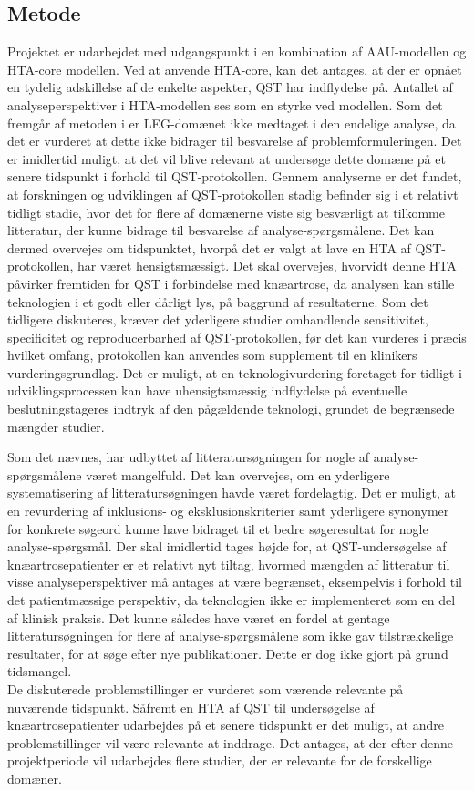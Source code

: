 \subsection{Metode} \label{Metode_diskussion} %
Projektet er udarbejdet med udgangspunkt i en kombination af AAU-modellen og HTA-core modellen. Ved at anvende HTA-core, kan det antages, at der er opnået en tydelig adskillelse af de enkelte aspekter, QST har indflydelse på.
Antallet af analyseperspektiver i HTA-modellen ses som en styrke ved modellen. Som det fremgår af metoden i  er LEG-domænet ikke medtaget i den endelige analyse, da det er vurderet at dette ikke bidrager til besvarelse af problemformuleringen. Det er imidlertid muligt, at det vil blive relevant at undersøge dette domæne på et senere tidspunkt i forhold til QST-protokollen. Gennem analyserne er det fundet, at forskningen og udviklingen af QST-protokollen stadig befinder sig i et relativt tidligt stadie, hvor det for flere af domænerne viste sig besværligt at tilkomme litteratur, der kunne bidrage til besvarelse af analyse-spørgsmålene. Det kan dermed overvejes om tidspunktet, hvorpå det er valgt at lave en HTA af QST-protokollen, har været hensigtsmæssigt. Det skal overvejes, hvorvidt denne HTA påvirker fremtiden for QST i forbindelse med knæartrose, da analysen kan stille teknologien i et godt eller dårligt lys, på baggrund af resultaterne. Som det tidligere diskuteres, kræver det yderligere studier omhandlende sensitivitet, specificitet og reproducerbarhed af QST-protokollen, før det kan vurderes i præcis hvilket omfang, protokollen kan anvendes som supplement til en klinikers vurderingsgrundlag. Det er muligt, at en teknologivurdering foretaget for tidligt i udviklingsprocessen kan have uhensigtsmæssig indflydelse på eventuelle beslutningstageres indtryk af den pågældende teknologi, grundet de begrænsede mængder studier.

Som det nævnes, har udbyttet af litteratursøgningen for nogle af analyse-spørgsmålene været mangelfuld. Det kan overvejes, om en yderligere systematisering af litteratursøgningen havde været fordelagtig. Det er muligt, at en revurdering af inklusions- og eksklusionskriterier samt yderligere synonymer for konkrete søgeord kunne have bidraget til et bedre søgeresultat for nogle analyse-spørgsmål. Der skal imidlertid tages højde for, at QST-undersøgelse af knæartrosepatienter er et relativt nyt tiltag, hvormed mængden af litteratur til visse analyseperspektiver må antages at være begrænset, eksempelvis i forhold til det patientmæssige perspektiv, da teknologien ikke er implementeret som en del af klinisk praksis. Det kunne således have været en fordel at gentage litteratursøgningen for flere af analyse-spørgsmålene som ikke gav tilstrækkelige resultater, for at søge efter nye publikationer. Dette er dog ikke gjort på grund tidsmangel.\\
De diskuterede problemstillinger er vurderet som værende relevante på nuværende tidspunkt. Såfremt en HTA af QST til undersøgelse af knæartrosepatienter udarbejdes på et senere tidspunkt er det muligt, at andre problemstillinger vil være relevante at inddrage. Det antages, at der efter denne projektperiode vil udarbejdes flere studier, der er relevante for de forskellige domæner.
